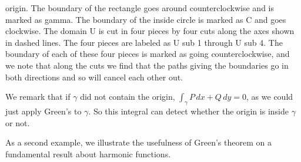 \begin{example}
\begin{myfigureht}
{origin.  The boundary of the rectangle goes around counterclockwise and is
marked as gamma.  The boundary of the inside circle is marked as C and goes
clockwise.  The domain U is cut in four pieces by four cuts along the axes
shown in dashed lines.  The four pieces are labeled as U sub 1 through
U sub 4.  The boundary of each of these four pieces is marked as going
counterclockwise, and we note that along the cuts we find that the paths
giving the boundaries go in both directions and so will cancel each other
out.}
\caption{Changing the box integral to an integral around a small circle around
the origin.  The domain $U$ is the entire shaded area between the circle and the
box.\label{fig:vortexbox}}
\end{myfigureht}

We remark that if $\gamma$ did not contain the origin, $\int_\gamma
P\,dx+Q\,dy = 0$, as we could just apply Green's to $\gamma$.
So this integral can detect whether the origin is inside $\gamma$ or not.
\end{example}

As a second example, we illustrate the usefulness of Green's theorem on a fundamental result
about harmonic functions.

